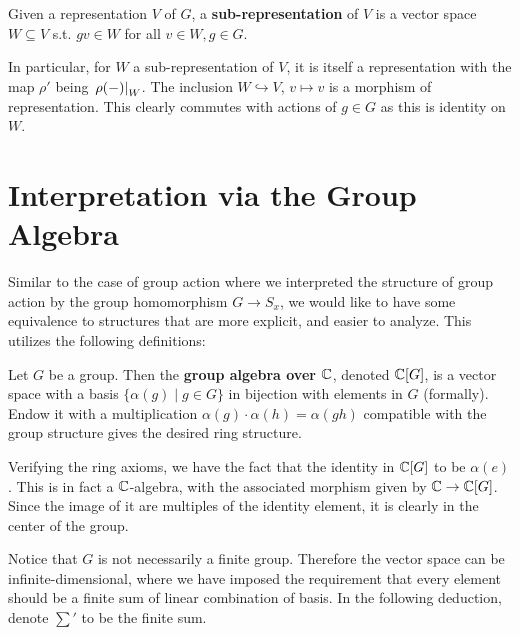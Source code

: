 \documentclass{article}
\begin{document}
\begin{definition}
    Given a representation $V$ of $G$, a \textbf{sub-representation} of $V$ is a vector space $W \subseteq V$ s.t. $gv \in W$ for all $v \in W, g \in G$. 
\end{definition}

\begin{remark}
    In particular, for $W$ a sub-representation of $V$, it is itself a representation with the map $\rho'$ being $\left.\rho(-)\right|_{W}$. The inclusion $W \hookrightarrow V$, $v \mapsto v$ is a morphism of representation. This clearly commutes with actions of $g \in G$ as this is identity on $W$.
\end{remark}

\section{Interpretation via the Group Algebra}

\textstart
Similar to the case of group action where we interpreted the structure of group action by the group homomorphism $G \to S_x$, we would like to have some equivalence to structures that are more explicit, and easier to analyze. This utilizes the following definitions:

\begin{definition}
    Let $G$ be a group. Then the \textbf{group algebra over $\mathbb{C}$}, denoted $\mathbb{C}[G]$, is a vector space with a basis $\{ \alpha(g) \mid g \in G \}$ in bijection with elements in $G$ (formally). Endow it with a multiplication $\alpha(g) \cdot \alpha(h) = \alpha(gh)$ compatible with the group structure gives the desired ring structure.
\end{definition}

\begin{remark}
    Verifying the ring axioms, we have the fact that the identity in $\mathbb{C}[G]$ to be $\alpha(e)$. This is in fact a $\mathbb{C}$-algebra, with the associated morphism given by $\mathbb{C} \to \mathbb{C}[G]$. Since the image of it are multiples of the identity element, it is clearly in the center of the group. 
\end{remark}

\textstart
Notice that $G$ is not necessarily a finite group. Therefore the vector space can be infinite-dimensional, where we have imposed the requirement that every element should be a finite sum of linear combination of basis. In the following deduction, denote $\sum'$ to be the finite sum. 
\end{document}
